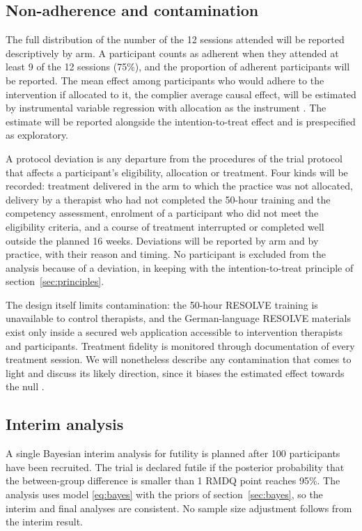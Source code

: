\documentclass[11pt,a4paper]{article}
\begin{document}
\subsection{Non-adherence and contamination}
\label{sec:adherence}

The full distribution of the number of the 12 sessions attended will be
reported descriptively by arm. A participant counts as adherent when they
attended at least 9 of the 12 sessions (75\%), and the proportion of
adherent participants will be reported.
The mean
effect among participants who would adhere to the intervention if allocated
to it, the complier average causal effect, will be estimated by
instrumental variable regression with allocation as the instrument
\citep{angrist1996}. The estimate will be reported alongside the
intention-to-treat effect and is prespecified as exploratory.

A protocol deviation is any departure from the procedures of the trial
protocol that affects a participant's eligibility, allocation or treatment.
Four kinds will be recorded: treatment delivered in the arm to which the
practice was not allocated, delivery by a therapist who had not completed the
50-hour training and the competency assessment, enrolment of a participant who
did not meet the eligibility criteria, and a course of treatment interrupted or
completed well outside the planned 16 weeks. Deviations will be reported by arm
and by practice, with their reason and timing. No participant is excluded from
the analysis because of a deviation, in keeping with the intention-to-treat
principle of section~\ref{sec:principles}.

The design itself limits contamination: the 50-hour
RESOLVE training is unavailable to control therapists, and the German-language
RESOLVE materials exist only inside a secured web application accessible to
intervention therapists and participants. Treatment fidelity is monitored
through documentation of every treatment session. We will nonetheless describe
any contamination that comes to light and discuss its likely direction, since
it biases the estimated effect towards the null \citep{hemming2021}.

\subsection{Interim analysis}
\label{sec:interim}

A single Bayesian interim analysis for futility is planned after
100 participants have been recruited. The trial is
declared futile if the posterior probability that the between-group
difference is smaller than 1 RMDQ point reaches 95\%. The analysis uses
model \eqref{eq:bayes} with the priors of section~\ref{sec:bayes}, so the
interim and final analyses are consistent. No sample size adjustment follows
from the interim result.
\end{document}
